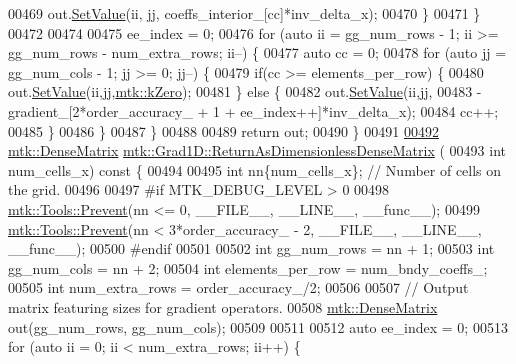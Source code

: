 \begin{DoxyCode}
{{00469       out.\hyperlink{classmtk_1_1DenseMatrix_ae0f873a6d3a734da467cafb817da64ae}{SetValue}(ii, jj, coeffs\_interior\_[cc]*inv\_delta\_x);
00470     \}
00471   \}
00472 
00474 
00475   ee\_index = 0;
00476   \textcolor{keywordflow}{for} (\textcolor{keyword}{auto} ii = gg\_num\_rows - 1; ii >= gg\_num\_rows - num\_extra\_rows; ii--) \{
00477     \textcolor{keyword}{auto} cc = 0;
00478     \textcolor{keywordflow}{for} (\textcolor{keyword}{auto} jj = gg\_num\_cols - 1; jj >= 0; jj--) \{
00479       \textcolor{keywordflow}{if}(cc >= elements\_per\_row) \{
00480         out.\hyperlink{classmtk_1_1DenseMatrix_ae0f873a6d3a734da467cafb817da64ae}{SetValue}(ii,jj,\hyperlink{group__c01-roots_ga59a451a5fae30d59649bcda274fea271}{mtk::kZero});
00481       \} \textcolor{keywordflow}{else} \{
00482         out.\hyperlink{classmtk_1_1DenseMatrix_ae0f873a6d3a734da467cafb817da64ae}{SetValue}(ii,jj,
00483                      -gradient\_[2*order\_accuracy\_ + 1 + ee\_index++]*inv\_delta\_x);
00484         cc++;
00485       \}
00486      \}
00487   \}
00488 
00489   \textcolor{keywordflow}{return} out;
00490 \}
00491 
\hypertarget{mtk__grad__1d_8cc_source_l00492}{}\hyperlink{classmtk_1_1Grad1D_ab07e6a15edca32534ae3d1a8ccaf1c42}{00492} \hyperlink{classmtk_1_1DenseMatrix}{mtk::DenseMatrix} \hyperlink{classmtk_1_1Grad1D_ab07e6a15edca32534ae3d1a8ccaf1c42}{mtk::Grad1D::ReturnAsDimensionlessDenseMatrix}
      (
00493   \textcolor{keywordtype}{int} num\_cells\_x)\textcolor{keyword}{ const }\{
00494 
00495   \textcolor{keywordtype}{int} nn\{num\_cells\_x\}; \textcolor{comment}{// Number of cells on the grid.}
00496 
00497 \textcolor{preprocessor}{  #if MTK\_DEBUG\_LEVEL > 0}
00498   \hyperlink{classmtk_1_1Tools_afe5bb096309258e2e72503fd7b41c7e0}{mtk::Tools::Prevent}(nn <= 0, \_\_FILE\_\_, \_\_LINE\_\_, \_\_func\_\_);
00499   \hyperlink{classmtk_1_1Tools_afe5bb096309258e2e72503fd7b41c7e0}{mtk::Tools::Prevent}(nn < 3*order\_accuracy\_ - 2, \_\_FILE\_\_, \_\_LINE\_\_, \_\_func\_\_);
00500 \textcolor{preprocessor}{  #endif}
00501 
00502   \textcolor{keywordtype}{int} gg\_num\_rows = nn + 1;
00503   \textcolor{keywordtype}{int} gg\_num\_cols = nn + 2;
00504   \textcolor{keywordtype}{int} elements\_per\_row = num\_bndy\_coeffs\_;
00505   \textcolor{keywordtype}{int} num\_extra\_rows = order\_accuracy\_/2;
00506 
00507   \textcolor{comment}{// Output matrix featuring sizes for gradient operators.}
00508   \hyperlink{classmtk_1_1DenseMatrix}{mtk::DenseMatrix} out(gg\_num\_rows, gg\_num\_cols);
00509 
00511 
00512   \textcolor{keyword}{auto} ee\_index = 0;
00513   \textcolor{keywordflow}{for} (\textcolor{keyword}{auto} ii = 0; ii < num\_extra\_rows; ii++) \{
}}
\end{DoxyCode}
